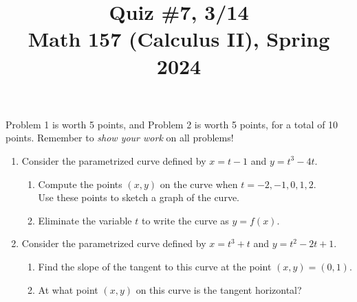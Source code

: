 \documentclass[11pt]{article}
\title{Quiz \#7, 3/14\\ Math 157 (Calculus II), Spring 2024}
\date{}
\begin{document}
\maketitle

\thispagestyle{empty}

\vspace{-2cm}

Problem 1 is worth 5 points, and Problem 2 is worth 5 points, for a total of 10 points. Remember to \emph{show your work} on all problems!

\begin{enumerate}
\item Consider the parametrized curve defined by $x = t-1$ and $y=t^3-4t$.
\begin{enumerate}
\item Compute the points $(x,y)$ on the curve when $t=-2, -1, 0, 1, 2$. \\ Use these points to sketch a graph of the curve.
\item Eliminate the variable $t$ to write the curve as $y=f(x)$.
\end{enumerate}

\vspace{3.15in}

\item Consider the parametrized curve defined by $x = t^3+t$ and $y=t^2-2t+1$.
\begin{enumerate}
\item Find the slope of the tangent to this curve at the point $(x,y) = (0,1)$.
\item At what point $(x,y)$ on this curve is the tangent horizontal?
\end{enumerate}

\end{enumerate}
\end{document}
